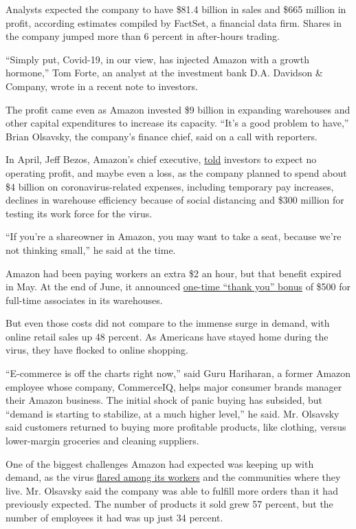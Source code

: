Analysts expected the company to have \$81.4 billion in sales and \$665
million in profit, according estimates compiled by FactSet, a financial
data firm. Shares in the company jumped more than 6 percent in
after-hours trading.

``Simply put, Covid-19, in our view, has injected Amazon with a growth
hormone,'' Tom Forte, an analyst at the investment bank D.A. Davidson \&
Company, wrote in a recent note to investors.

The profit came even as Amazon invested \$9 billion in expanding
warehouses and other capital expenditures to increase its capacity.
``It's a good problem to have,'' Brian Olsavsky, the company's finance
chief, said on a call with reporters.

In April, Jeff Bezos, Amazon's chief executive,
\href{https://www.nytimes3xbfgragh.onion/2020/04/30/technology/amazon-stock-earnings-report.html}{told}
investors to expect no operating profit, and maybe even a loss, as the
company planned to spend about \$4 billion on coronavirus-related
expenses, including temporary pay increases, declines in warehouse
efficiency because of social distancing and \$300 million for testing
its work force for the virus.

``If you're a shareowner in Amazon, you may want to take a seat, because
we're not thinking small,'' he said at the time.

Amazon had been paying workers an extra \$2 an hour, but that benefit
expired in May. At the end of June, it announced
\href{https://blog.aboutamazon.com/operations/a-thank-you-bonus-for-amazon-front-line-employees-and-partners}{one-time
``thank you'' bonus} of \$500 for full-time associates in its
warehouses.

But even those costs did not compare to the immense surge in demand,
with online retail sales up 48 percent. As Americans have stayed home
during the virus, they have flocked to online shopping.

``E-commerce is off the charts right now,'' said Guru Hariharan, a
former Amazon employee whose company, CommerceIQ, helps major consumer
brands manager their Amazon business. The initial shock of panic buying
has subsided, but ``demand is starting to stabilize, at a much higher
level,'' he said. Mr. Olsavsky said customers returned to buying more
profitable products, like clothing, versus lower-margin groceries and
cleaning suppliers.

One of the biggest challenges Amazon had expected was keeping up with
demand, as the virus
\href{https://www.nytimes3xbfgragh.onion/2020/05/19/technology/amazon-coronavirus-workers.html}{flared
among its workers} and the communities where they live. Mr. Olsavsky
said the company was able to fulfill more orders than it had previously
expected. The number of products it sold grew 57 percent, but the number
of employees it had was up just 34 percent.

